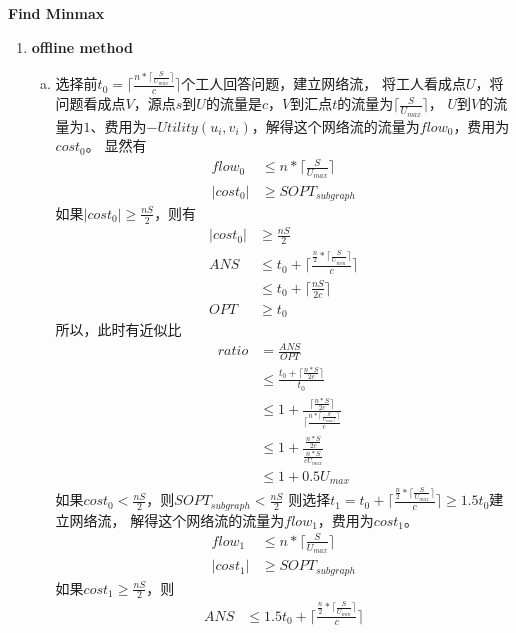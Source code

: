 \documentclass[UTF8]{ctexart}
\newcommand{\Emph}{\textbf}
\begin{document}
\newpage
\Emph{Find Minmax}
\begin{enumerate}[I]
	\item \Emph{offline method}
	
	\begin{enumerate}[(a)]
		\item 选择前$t_{0} = \lceil \frac{n * \lceil \frac{S}{U_{max}} \rceil}{c} \rceil$个工人回答问题，建立网络流，
		将工人看成点$U$，将问题看成点$V$，源点$s$到$U$的流量是$c$，$V$到汇点$t$的流量为$\lceil \frac{S}{U_{max}} \rceil$，
		$U$到$V$的流量为$1$、费用为$-Utility(u_i, v_i)$，解得这个网络流的流量为$flow_{0}$，费用为$cost_{0}$。
		显然有
		\begin{align*}
			flow_{0} &\le n * \lceil \frac{S}{U_{max}} \rceil \\
			|cost_{0}| &\ge SOPT_{subgraph}
		\end{align*}
		如果$|cost_{0}| \ge \frac{nS}{2}$，则有
		\begin{align*}
			|cost_{0}| &\ge \frac{nS}{2} \\
			ANS &\le t_0 + \lceil \frac{\frac{n}{2} * \lceil \frac{S}{U_{min}} \rceil}{c} \rceil \\
				&\le t_0 + \lceil \frac{nS}{2c} \rceil \\
			OPT &\ge t_0
		\end{align*}
		所以，此时有近似比
		\begin{align*}
			ratio &= \frac{ANS}{OPT} \\
				  &\le \frac{t_0 + \lceil \frac{n*S}{2c} \rceil}{t_0} \\
				  &\le 1 + \frac{\lceil \frac{n*S}{2c} \rceil}{\lceil \frac{n * \lceil \frac{S}{U_{max} \rceil} \rceil}{c}} \\
				  &\le 1 + \frac{\frac{n*S}{2c}}{\frac{n*S}{cU_{max}}} \\
				  &\le 1 + 0.5U_{max}
		\end{align*}
		如果$cost_{0} < \frac{nS}{2}$，则$SOPT_{subgraph} < \frac{nS}{2}$
		则选择$t_1 = t_{0} + \lceil \frac{\frac{n}{2} * \lceil \frac{S}{U_{max}} \rceil}{c} \rceil \ge 1.5t_{0}$建立网络流，
		解得这个网络流的流量为$flow_{1}$，费用为$cost_{1}$。
		\begin{align*}
			flow_{1} &\le n * \lceil \frac{S}{U_{max}} \rceil \\
			|cost_{1}| &\ge SOPT_{subgraph}
		\end{align*}
		如果$cost_{1} \ge \frac{nS}{2}$，则
		\begin{align*}
			ANS &\le 1.5t_{0} + \lceil \frac{\frac{n}{2} * \lceil \frac{S}{U_{min}} \rceil}{c} \rceil \\

\end{align*}
\end{enumerate}
\end{enumerate}
\end{document}
